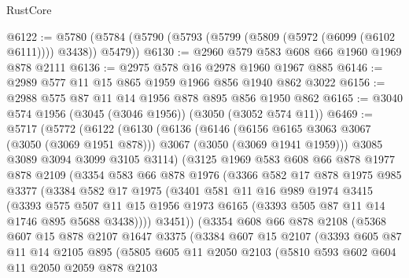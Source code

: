 \begin{lexlean}{RustCore}
\begin{coremodule}
@6122 := @5780 (@5784 (@5790 (@5793 (@5799 (@5809 (@5972 (@6099 (@6102 @6111)))) @3438)) @5479))
@6130 := @2960 @579 @583 @608 @66 @1960 @1969 @878 @2111
@6136 := @2975 @578 @16 @2978 @1960 @1967 @885
@6146 := @2989 @577 @11 @15 @865 @1959 @1966 @856 @1940 @862 @3022
@6156 := @2988 @575 @87 @11 @14 @1956 @878 @895 @856 @1950 @862
@6165 := @3040 @574 @1956 (@3045 (@3046 @1956)) (@3050 (@3052 @574 @11))
@6469 := @5717
    (@5772
      (@6122
        (@6130
          (@6136
            (@6146
              (@6156 @6165 @3063 @3067 (@3050 (@3069 @1951 @878)))
              @3067
              (@3050 (@3069 @1941 @1959)))
            @3085
            @3089
            @3094
            @3099
            @3105
            @3114)
          (@3125
            @1969
            @583
            @608
            @66
            @878
            @1977
            @878
            @2109
            (@3354
              @583
              @66
              @878
              @1976
              (@3366
                @582
                @17
                @878
                @1975
                @985
                @3377
                (@3384
                  @582
                  @17
                  @1975
                  (@3401
                    @581
                    @11
                    @16
                    @989
                    @1974
                    @3415
                    (@3393
                      @575
                      @507
                      @11
                      @15
                      @1956
                      @1973
                      @6165
                      (@3393 @505 @87 @11 @14 @1746 @895 @5688 @3438))))
                @3451))
            (@3354
              @608
              @66
              @878
              @2108
              (@5368
                @607
                @15
                @878
                @2107
                @1647
                @3375
                (@3384
                  @607
                  @15
                  @2107
                  (@3393
                    @605
                    @87
                    @11
                    @14
                    @2105
                    @895
                    (@5805
                      @605
                      @11
                      @2050
                      @2103
                      (@5810
                        @593
                        @602
                        @604
                        @11
                        @2050
                        @2059
                        @878
                        @2103

\end{coremodule}
\end{lexlean}
